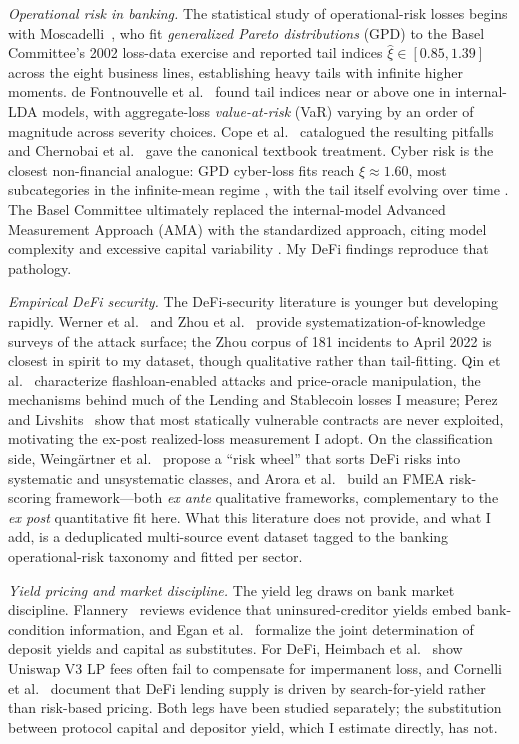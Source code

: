 \documentclass[runningheads]{llncs}
\begin{document}
\emph{Operational risk in banking.} The statistical study of
operational-risk losses begins with Moscadelli~\cite{Moscadelli2004},
who fit \emph{generalized Pareto distributions} (GPD) to the Basel
Committee's 2002 loss-data exercise and reported tail indices
$\hat\xi \in [0.85,1.39]$ across the eight business lines, establishing
heavy tails with infinite higher moments. de Fontnouvelle et
al.~\cite{Fontnouvelle2006} found tail indices near or above one in
internal-LDA models, with aggregate-loss \emph{value-at-risk} (VaR)
varying by an order of magnitude across severity choices. Cope et
al.~\cite{Cope2009} catalogued the resulting pitfalls and Chernobai et
al.~\cite{Chernobai2008} gave the canonical textbook treatment. Cyber
risk is the closest non-financial analogue: GPD cyber-loss fits reach
$\hat\xi \approx 1.60$, most subcategories in the infinite-mean regime
\citep{Eling2019}, with the tail itself evolving over time
\citep{Wheatley2016}. The Basel Committee ultimately replaced the
internal-model Advanced Measurement Approach (AMA) with the
standardized approach, citing model complexity and excessive capital
variability \citep{BCBS2017}. My DeFi findings reproduce that pathology.

\emph{Empirical DeFi security.} The DeFi-security literature is younger
but developing rapidly. Werner et al.~\cite{Werner2022} and Zhou et
al.~\cite{Zhou2023} provide systematization-of-knowledge surveys of the
attack surface; the Zhou corpus of 181 incidents to April 2022 is
closest in spirit to my dataset, though qualitative rather than
tail-fitting. Qin et al.~\cite{Qin2021} characterize flashloan-enabled
attacks and price-oracle manipulation, the mechanisms behind much of
the Lending and Stablecoin losses I measure; Perez and
Livshits~\cite{Perez2021} show that most statically vulnerable
contracts are never exploited, motivating the ex-post realized-loss
measurement I adopt. On the classification side, Weing\"artner et
al.~\cite{Weingartner2023} propose a ``risk wheel'' that sorts DeFi
risks into systematic and unsystematic classes, and Arora et
al.~\cite{Arora2026} build an FMEA risk-scoring framework---both
\emph{ex ante} qualitative frameworks, complementary to the \emph{ex
post} quantitative fit here. What this literature does not provide,
and what I add, is a deduplicated multi-source event dataset tagged to
the banking operational-risk taxonomy and fitted per sector.

\emph{Yield pricing and market discipline.} The yield leg draws on bank
market discipline. Flannery~\cite{Flannery1998} reviews evidence that
uninsured-creditor yields embed bank-condition information, and Egan et
al.~\cite{Egan2017} formalize the joint determination of deposit yields
and capital as substitutes. For DeFi, Heimbach et
al.~\cite{Heimbach2022} show Uniswap V3 LP fees often fail to compensate
for impermanent loss, and Cornelli et al.~\cite{Cornelli2025} document
that DeFi lending supply is driven by search-for-yield rather than
risk-based pricing. Both legs have been studied separately; the
substitution between protocol capital and depositor yield, which I
estimate directly, has not.
\end{document}
